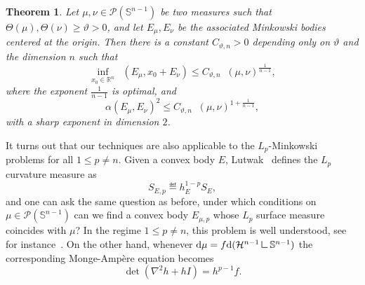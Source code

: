 \documentclass[a4paper, 10pt, twoside]{amsart}
\numberwithin{equation}{section}
\newcommand{\theoname}{Theorem}
\theoremstyle{plain}
\newtheorem{theorem}{\theoname}[section]
\theoremstyle{definition}
\DeclareMathOperator{\dc}{\mathrm{d}_\mathrm{C}}
\DeclareMathOperator{\dH}{\mathrm{d}_\mathrm{H}}
\begin{document}
\begin{theorem}\label{thm.quantitative_stability_p=1}
    Let $\mu, \nu \in \mathscr{P}(\mathbb{S}^{n-1})$ be two measures such that $\Theta(\mu), \Theta(\nu) \ge \vartheta >0$, and let $E_\mu, E_\nu$ be the associated Minkowski bodies centered at the origin. Then there is a constant $C_{\vartheta,n} >0$ depending only on $\vartheta$ and the dimension $n$ such that 
    \begin{equation}
        \inf_{x_0 \in \mathbb{R}^n} 
        \dH(E_\mu, x_0 + E_\nu) 
        \le C_{\vartheta,n} {\dc(\mu,\nu)}^{\frac{1}{n-1}},
    \end{equation}
    where the exponent $\frac{1}{n-1}$ is optimal, 
    and 
    \begin{equation}
        {\alpha(E_\mu, E_\nu)}^2
        \le 
        C_{\vartheta,n} {\dc(\mu, \nu)}^{1 + \frac{1}{n-1}},
    \end{equation}
    with a sharp exponent in dimension $2$.
\end{theorem}

It turns out that our techniques are also applicable to the $L_p$-Minkowski problems for all $1 \le p \neq n$. Given a convex body $E$, Lutwak~\cite{lutwak1992brunn-minkowki-firey,lutwak1996brunn} defines the $L_p$ curvature measure as
\begin{equation}
    S_{E,p} \eqdef h_E^{1-p}S_E,
\end{equation}
and one can ask the same question as before, under which conditions on $\mu \in \mathscr{P}(\mathbb{S}^{n-1})$ can we find a convex body $E_{\mu,p}$ whose $L_p$ surface measure coincides with $\mu$? In the regime $1 \le p \neq n$, this problem is well understood, see for instance~\cite{cheng1976regularity,hug2005lp,boroczkylogarithmic,HYZ2025}. On the other hand, whenever $\dd\mu=f\dd(\mathcal{H}^{n-1}\mres \mathbb{S}^{n-1})$ the corresponding Monge-Ampère equation becomes  
\[
    \det(\nabla^2 h+h I)=h^{p-1}f. 
\]
\end{document}
